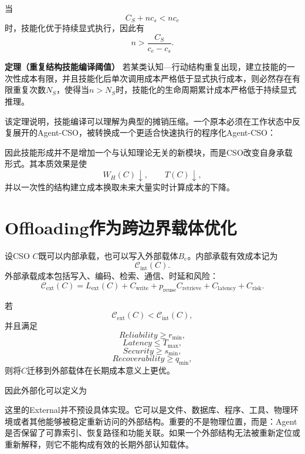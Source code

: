 当
\[
C_S+nc_s<nc_e
\]
时，技能化优于持续显式执行，因此有
\[
\boxed{
n
>
\frac{C_S}{c_e-c_s}.
}
\]

\textbf{定理（重复结构技能编译阈值）}
若某类认知—行动结构重复出现，建立技能的一次性成本有限，并且技能化后单次调用成本严格低于显式执行成本，则必然存在有限重复次数$N_S$，使得当$n>N_S$时，技能化的生命周期累计成本严格低于持续显式推理。

该定理说明，技能编译可以理解为典型的摊销压缩。一个原本必须在工作状态中反复展开的Agent-CSO，被转换成一个更适合快速执行的程序化Agent-CSO：
\begin{statementbox}
\centering
{}
\end{statementbox}

因此技能形成并不是增加一个与认知理论无关的新模块，而是CSO改变自身承载形式。其本质效果是使
\[
W_H(C)\downarrow,
\qquad
T(C)\downarrow,
\]
并以一次性的结构建立成本换取未来大量实时计算成本的下降。

\section{Offloading作为跨边界载体优化}

设CSO $C$既可以内部承载，也可以写入外部载体$B_e$。内部承载有效成本记为
\[
\mathscr C_{\mathrm{int}}(C).
\]
外部承载成本包括写入、编码、检索、通信、时延和风险：
\[
\boxed{
\mathscr C_{\mathrm{ext}}(C)
=
L_{\mathrm{ext}}(C)
+
C_{\mathrm{write}}
+
p_{\mathrm{reuse}}C_{\mathrm{retrieve}}
+
C_{\mathrm{latency}}
+
C_{\mathrm{risk}}.
}
\]

若
\[
\mathscr C_{\mathrm{ext}}(C)
<
\mathscr C_{\mathrm{int}}(C),
\]
并且满足
\[
Reliability
\geq r_{\min},
\]
\[
Latency
\leq T_{\max},
\]
\[
Security
\geq s_{\min},
\]
\[
Recoverability
\geq q_{\min},
\]
则将$C$迁移到外部载体在长期成本意义上更优。

因此外部化可以定义为
\begin{statementbox}
\centering
{}
\end{statementbox}

这里的External并不预设具体实现。它可以是文件、数据库、程序、工具、物理环境或者其他能够被稳定重新访问的外部结构。重要的不是物理位置，而是：Agent是否保留了可靠索引、恢复路径和功能关联。如果一个外部结构无法被重新定位或重新解释，则它不能构成有效的长期外部认知载体。

